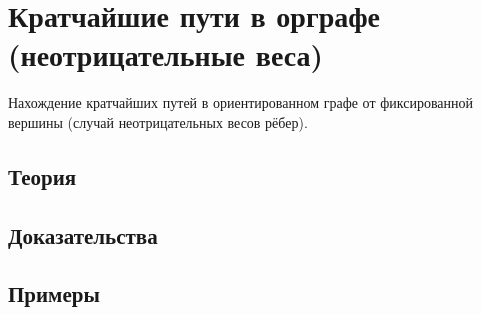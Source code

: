 
\section{Кратчайшие пути в орграфе (неотрицательные веса)}
\label{sec:2.2.10-shortest-paths-digraph}

\begin{ticket}
Нахождение кратчайших путей в ориентированном графе от фиксированной вершины (случай неотрицательных весов рёбер).
\end{ticket}

\subsection*{Теория}

\subsection*{Доказательства}

\subsection*{Примеры}
